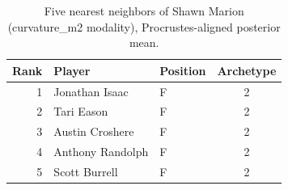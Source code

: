 \begin{table}[htbp]
  \centering\small
  \begin{tabular}{rllc}
    \toprule
    Rank & Player & Position & Archetype \\
    \midrule
    1 & Jonathan Isaac & F & 2 \\
    2 & Tari Eason & F & 2 \\
    3 & Austin Croshere & F & 2 \\
    4 & Anthony Randolph & F & 2 \\
    5 & Scott Burrell & F & 2 \\
    \bottomrule
  \end{tabular}
  \caption{Five nearest neighbors of Shawn Marion (curvature_m2 modality), Procrustes-aligned posterior mean.}
  \label{tab:Shawn_Marion_neighbors_curvature_m2}
\end{table}

